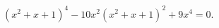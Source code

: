 \begin{ex}[type=equation]
	\begin{condition}
		$\left(x^2 + x + 1\right)^4 - 10x^2\left(x^2 + x + 1\right)^2 + 9x^4 = 0.$
	\end{condition}
\end{ex}